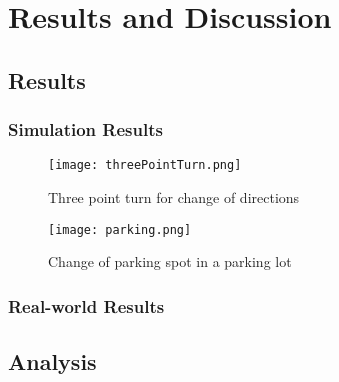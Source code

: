\chapter{Results and Discussion}

\section{Results}

\subsection{Simulation Results}

\begin{figure}[h]
    \texttt{[image: threePointTurn.png]}
    \caption{Three point turn for change of directions}
    \label{fig:threePointTurn}
\end{figure}

\begin{figure}[h]
    \texttt{[image: parking.png]}
    \caption{Change of parking spot in a parking lot}
    \label{fig:parking}
\end{figure}

\subsection{Real-world Results}

\section{Analysis}